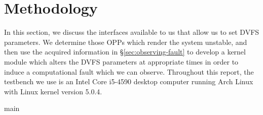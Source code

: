 \chapter{Methodology}

In this section, we discuss the interfaces available to us that allow us to set
DVFS parameters. We determine those OPPs which render the system unstable, and
then use the acquired information in §\ref{sec:observing-fault} to develop a
kernel module which alters the DVFS parameters at appropriate times in order to
induce a computational fault which we can observe. Throughout this report, the
testbench we use is an Intel Core i5-4590 desktop computer running Arch Linux
with Linux kernel version 5.0.4.

{main}






